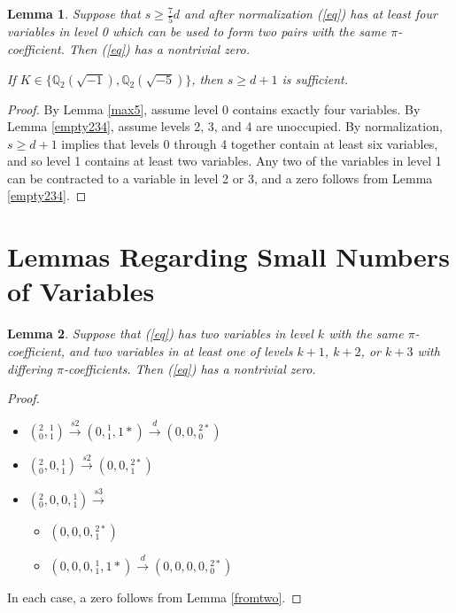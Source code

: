 \documentclass[12pt]{amsart}
\newtheorem{lemma}{Lemma}
\begin{document}
\begin{lemma} \label{max4}
Suppose that $s \ge \frac{7}{5}d$ and after normalization (\ref{eq}) has at least four variables in level 0 which can be used to form two pairs with the same $\pi$-coefficient.  Then (\ref{eq}) has a nontrivial zero.  

If $K \in \{\mathbb{Q}_2(\sqrt{-1}), \mathbb{Q}_2(\sqrt{-5})\}$, then $s \ge d + 1$ is sufficient.
\end{lemma}
\begin{proof}
By Lemma \ref{max5}, assume level 0 contains exactly four variables.  By Lemma \ref{empty234}, assume levels 2, 3, and 4 are unoccupied. By normalization, $s \ge d + 1$ implies that levels 0 through 4 together contain at least six variables, and so level 1 contains at least two variables.  Any two of the variables in level 1 can be contracted to a variable in level 2 or 3, and a zero follows from Lemma \ref{empty234}.
\end{proof}

\section{Lemmas Regarding Small Numbers of Variables}

\begin{lemma}\label{2same2diff}
Suppose that (\ref{eq}) has two variables in level $k$ with the same $\pi$-coefficient, and two variables in at least one of levels $k+1$, $k+2$, or $k+3$ with differing $\pi$-coefficients.  Then (\ref{eq}) has a nontrivial zero.
\end{lemma}
\begin{proof}~

\begin{itemize}
    \item $({}^{2}_{0}, {}^{1}_{1}) \xrightarrow{s2} (0, {}^{1}_{1}, 1*) \xrightarrow{d} (0, 0, {}^{2*}_{0})$
    \item $({}^{2}_{0}, 0, {}^{1}_{1}) \xrightarrow{s2} (0, 0, {}^{2*}_{1})$
    \item $({}^{2}_{0}, 0, 0, {}^{1}_{1}) \xrightarrow{s3}$
    \begin{itemize}
        \item $(0, 0, 0, {}^{2*}_{1})$
        \item $(0, 0, 0, {}^{1}_{1}, 1*) \xrightarrow{d} (0, 0, 0, 0, {}^{2*}_{0})$
    \end{itemize}
\end{itemize}

In each case, a zero follows from Lemma \ref{fromtwo}.
\end{proof}
\end{document}
